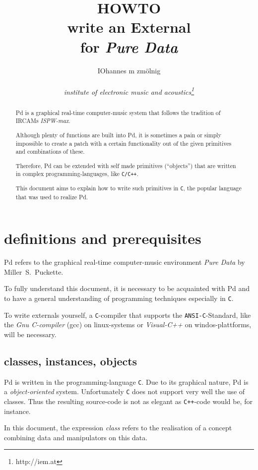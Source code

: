 \documentclass[12pt, a4paper,english,titlepage]{article}
\title{
HOWTO \\
write an External \\
for {\em Pure Data}
}
\author{
IOhannes m zmölnig \\
\\
{\em institute of electronic music and acoustics\footnote{http://iem.at}}
}
\date{}
\begin{document}
\maketitle

\begin{abstract}
Pd is a graphical real-time computer-music system that follows the tradition of
IRCAMs {\em ISPW-max}.

Although plenty of functions are built into Pd,
it is sometimes a pain or simply impossible to create a patch with a certain
functionality out of the given primitives and combinations of these.

Therefore, Pd can be extended with self made primitives (``objects'')
that are written in complex programming-languages, like {\tt C/C++}. 

This document aims to explain how to write such primitives in {\tt C},
the popular language that was used to realize Pd.
\end{abstract}


\vfill
\newpage

\tableofcontents

\vfill
\newpage

\section{definitions and prerequisites}
Pd refers to the graphical real-time computer-music environment {\em Pure Data}
by Miller~S.~Puckette.

To fully understand this document, it is necessary to
be acquainted with Pd and to 
have a general understanding of programming techniques especially in {\tt C}.

To write externals yourself, a {\tt C}-compiler that supports the
{\tt ANSI-C}-Standard, like the {\em Gnu C-compiler} (gcc) on linux-systems or
{\em Visual-C++} on windos-plattforms, will be necessary.

\subsection{classes, instances, objects}
Pd is written in the programming-language {\tt C}.
Due to its graphical nature, Pd is a {\em object-oriented} system.
Unfortunately {\tt C} does not support very well the use of classes.
Thus the resulting source-code is not as elegant as {\tt C++}-code would be, for instance.

In this document, the expression {\em class} refers to the realisation of a concept
combining data and manipulators on this data.
\end{document}
